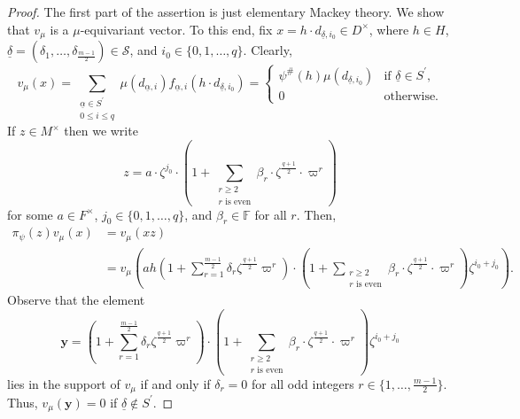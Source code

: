 \documentclass[12pt]{amsart}
\theoremstyle{definition}
\theoremstyle{remark}
\begin{document}
\begin{proof}
The first part of the assertion is just elementary Mackey theory. We show that $v_\mu$ is a $\mu$-equivariant vector. To this end, fix $x=h \cdot d_{\underline{\delta}, i_0} \in D^\times$, where $h \in H$, $\underline{\delta}=(\delta_1,\dots,\delta_{\frac{m-1}{2}}) \in \mathcal{S}$, and $i_0 \in \{0,1,\dots,q\}$. Clearly,
\[v_{\mu}(x) = \sum\limits_{\substack{\underline{\alpha} \in S^\prime  \\    0 \leq i \leq q }}\mu(d_{\underline{\alpha}, i}) f_{\underline{\alpha}, i}(h \cdot d_{\underline{\delta}, i_0}) = 
\begin{cases}
\psi^\#(h)\mu(d_{\underline{\delta}, i_0})  &\text{if $\underline{\delta} \in S^\prime$,}  \\
0 &\text{otherwise.}\end{cases}\]
If $z \in M^\times$ then we write 
\[z= a \cdot \zeta^{j_0} \cdot (1 + \sum\limits_{\substack{r \geq 2  \\    r \text{ is even} }}\beta_r \cdot  \zeta^{\frac{q+1}{2}} \cdot \varpi^r ) \]
for some $a \in F^\times$, $j_0 \in \{0,1,\dots,q\}$, and $\beta_r \in \mathbb F$ for all $r$. Then,
\begin{align*}
\pi_\psi(z) v_{\mu}(x) &= v_{\mu}(xz) \\
&= v_{\mu}\left(ah\left(1 + \sum\limits_{r=1}^{\frac{m-1}{2}} \delta_r \zeta^{\frac{q+1}{2}} \varpi^r \right) \cdot \left(1 + \sum\limits_{\substack{r \geq 2  \\    r \text{ is even} }}\beta_r \cdot  \zeta^{\frac{q+1}{2}} \cdot \varpi^r \right) \zeta^{i_0 + j_0} \right).
\end{align*}
Observe that the element 
\[\textbf{y} = \left(1 + \sum\limits_{r=1}^{\frac{m-1}{2}} \delta_r \zeta^{\frac{q+1}{2}} \varpi^r \right) \cdot \left(1 + \sum\limits_{\substack{r \geq 2  \\    r \text{ is even} }}\beta_r \cdot  \zeta^{\frac{q+1}{2}} \cdot \varpi^r \right) \zeta^{i_0 + j_0}\]
lies in the support of $v_\mu$ if and only if $\delta_r = 0$ for all odd integers $r \in \{1,\dots,\frac{m-1}{2} \}$. Thus, $v_\mu(\textbf{y})=0$ if $\underline{\delta} \notin S^\prime$. 


\end{proof}
\end{document}
